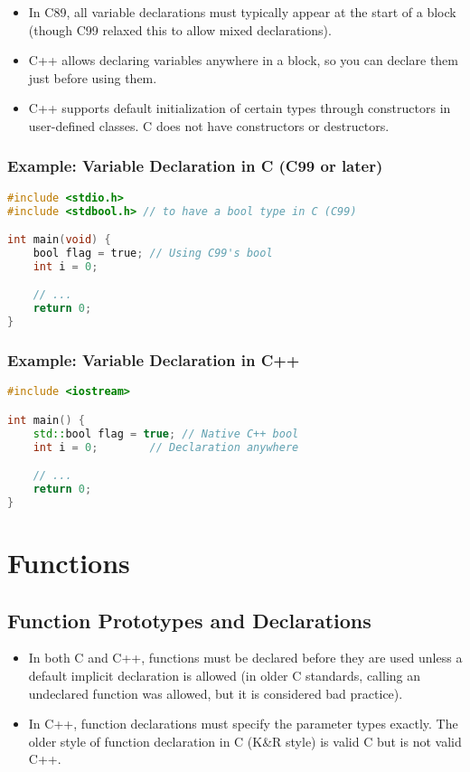 \documentclass[a4paper,12pt]{article}
\begin{document}
\begin{itemize}
    \item In C89, all variable declarations must typically appear at the start of a block (though C99 relaxed this to allow mixed declarations).
    \item C++ allows declaring variables anywhere in a block, so you can declare them just before using them.
    \item C++ supports default initialization of certain types through constructors in user-defined classes. C does not have constructors or destructors.
\end{itemize}

\subsubsection{Example: Variable Declaration in C (C99 or later)}
\begin{lstlisting}[language=C]
#include <stdio.h>
#include <stdbool.h> // to have a bool type in C (C99)

int main(void) {
    bool flag = true; // Using C99's bool
    int i = 0;

    // ...
    return 0;
}
\end{lstlisting}

\subsubsection{Example: Variable Declaration in C++}
\begin{lstlisting}[language=C++]
#include <iostream>

int main() {
    std::bool flag = true; // Native C++ bool
    int i = 0;        // Declaration anywhere

    // ...
    return 0;
}
\end{lstlisting}

\section{Functions}

\subsection{Function Prototypes and Declarations}
\begin{itemize}
    \item In both C and C++, functions must be declared before they are used unless a default implicit declaration is allowed (in older C standards, calling an undeclared function was allowed, but it is considered bad practice).
    \item In C++, function declarations must specify the parameter types exactly. The older style of function declaration in C (K\&R style) is valid C but is not valid C++.
\end{itemize}
\end{document}
